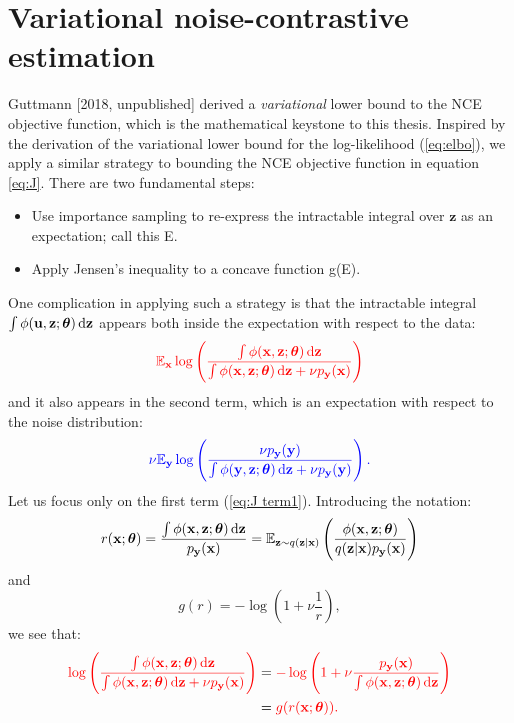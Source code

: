 \documentclass[11pt, oneside]{article}
\newcommand{\thetab}{{\boldsymbol{\theta}}}
\newcommand{\pnn}{\phi}
\newcommand{\pnoise}{p_{ \mathbf y}}
\newcommand{\q}[1]{q(\z|{#1})}
\renewcommand{\u}{{\mathbf u}}
\newcommand{\x}{{\mathbf x}}
\newcommand{\y}{{\mathbf y}}
\newcommand{\z}{{\mathbf z}}
\newcommand{\E}{\mathbb{E}}
\newcommand{\Ex}{\E_{\x}}
\newcommand{\Ey}{\E_{\y}}
\newcommand{\Evar}[1]{\E_{\z \sim \q{#1}}}
\theoremstyle{definition}
\begin{document}
\section{Variational noise-contrastive estimation}
\label{sec:VNCE}
Guttmann [2018, unpublished] derived a \emph{variational} lower bound to the NCE objective function, which is the mathematical keystone to this thesis. Inspired by the derivation of the variational lower bound for the log-likelihood (\ref{eq:elbo}), we apply a similar strategy to bounding the NCE objective function in equation \ref{eq:J}. There are two fundamental steps: 
\begin{itemize}
    \item Use importance sampling to re-express the intractable integral over $\z$ as an expectation; call this E.
    \item Apply Jensen’s inequality to a concave function g(E).
\end{itemize}
One complication in applying such a strategy is that the intractable integral $\int \pnn(\u, \z;\thetab) \dif \z$ appears both inside the expectation with respect to the data:
\begin{align}
    \color{red}{\Ex  \log \left(\frac{\int \pnn(\x, \z;\thetab) \dif \z}{\int \pnn(\x, \z;\thetab) \dif \z + \nu \pnoise(\x)}\right)}
    \label{eq:J term1}
\end{align}
and it also appears in the second term, which is an expectation with respect to the noise distribution:
\begin{align}
    \color{blue}{\nu \Ey \log \left( \frac{\nu \pnoise(\y)}{\int \pnn(\y, \z;\thetab) \dif \z + \nu \pnoise(\y)}\right).}
    \label{eq:J term2}
\end{align}
Let us focus only on the first term (\ref{eq:J term1}). Introducing the notation:
\begin{equation}
  r(\x;\thetab) = \frac{\int \pnn(\x, \z;\thetab) \dif \z}{\pnoise(\x)} = \Evar{\x} \left( \frac{\pnn(\x, \z;\thetab)}{\q{\x}\pnoise(\x)} \right)
  \label{eq:r-def}
\end{equation}
and
\begin{equation}
  g(r) = -\log \left(1+\nu \frac{1}{r} \right),
\end{equation}
we see that:
\begin{align}
    \color{red}{\log \left(\frac{\int \pnn(\x, \z;\thetab) \dif \z}{\int \pnn(\x, \z;\thetab) \dif \z + \nu \pnoise(\x)}\right)} 
    &= \color{red}{- \log \left( 1 + \nu \frac{\pnoise(\x)}{\int \pnn(\x, \z;\thetab) \dif \z}\right)} \\
    &=   \color{red}{g(r(\x; \thetab)).}
\end{align}
\end{document}
